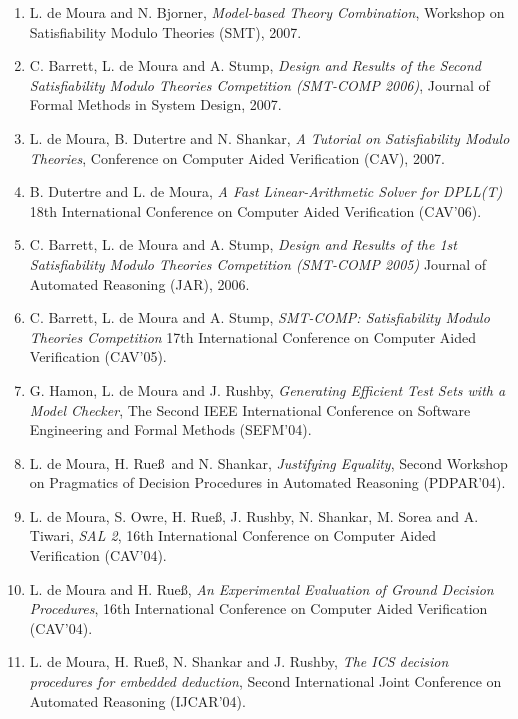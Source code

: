 \documentclass{article}
\begin{document}
\begin{enumerate}
\item L. de Moura and N. Bjorner, {\em Model-based Theory Combination}, Workshop on Satisfiability Modulo Theories (SMT), 2007.

\item C. Barrett, L. de Moura and A. Stump,
{\em Design and Results of the Second Satisfiability Modulo Theories Competition (SMT-COMP 2006)}, Journal of Formal Methods in System Design, 2007.

\item L. de Moura, B. Dutertre and N. Shankar,
{\em A Tutorial on Satisfiability Modulo Theories}, Conference on Computer Aided Verification (CAV), 2007.

\item B. Dutertre and L. de Moura,
{\em A Fast Linear-Arithmetic Solver for DPLL(T)}
18th International Conference on Computer Aided Verification (CAV'06).

\item C. Barrett, L. de Moura and A. Stump,
{\em Design and Results of the 1st Satisfiability Modulo Theories Competition (SMT-COMP 2005)}
Journal of Automated Reasoning (JAR), 2006.

\item C. Barrett, L. de Moura and A. Stump,
{\em SMT-COMP: Satisfiability Modulo Theories Competition}
17th International Conference on Computer Aided Verification (CAV'05).

\item G. Hamon, L. de Moura and J. Rushby,
{\em Generating Efficient Test Sets with a Model Checker},
The Second IEEE International Conference on Software Engineering and Formal Methods (SEFM'04).

\item L. de Moura, H. Rue\ss\ and N. Shankar,
{\em Justifying Equality},
Second Workshop on Pragmatics of Decision Procedures in Automated Reasoning (PDPAR'04).

\item L. de Moura, S. Owre, H. Rue\ss, J. Rushby, N. Shankar, M. Sorea and A. Tiwari,
{\em SAL 2},
16th International Conference on Computer Aided Verification (CAV'04).

\item L. de Moura and H. Rue\ss,
{\em An Experimental Evaluation of Ground Decision Procedures},
16th International Conference on Computer Aided Verification (CAV'04).

\item L. de Moura, H. Rue\ss, N. Shankar and J. Rushby,
{\em The ICS decision procedures for embedded deduction},
Second International Joint Conference on Automated Reasoning (IJCAR'04).


\end{enumerate}
\end{document}
